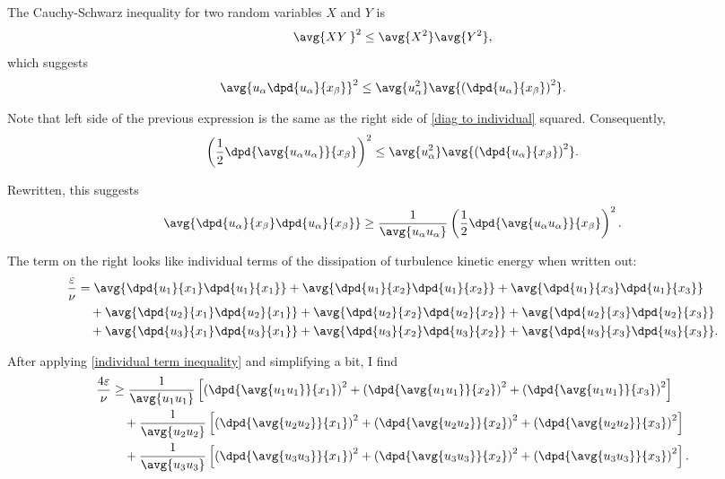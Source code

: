 \documentclass[ccbysa,note,git]{bmtreport}
\begin{document}
The Cauchy-Schwarz inequality for two random variables $X$ and $Y$ is
\begin{equation}
   \avg{X Y\kern2pt}^2 \leq \avg{X^2} \avg{Y^2},
\end{equation}
which suggests
\begin{equation}
   \avg{u_\alpha \dpd{u_\alpha}{x_\beta}}^2 \leq \avg{u_\alpha^2} \avg{\left(\dpd{u_\alpha}{x_\beta}\right)^2}.
\end{equation}

Note that left side of the previous expression is the same as the right side of \eqref{diag to individual} squared. Consequently,
\begin{equation}
   \left(\frac{1}{2} \dpd{\avg{u_\alpha u_\alpha}}{x_\beta}\right)^2 \leq \avg{u_\alpha^2} \avg{\left(\dpd{u_\alpha}{x_\beta}\right)^2}.
\end{equation}

Rewritten, this suggests
\begin{equation}
   \avg{\dpd{u_\alpha}{x_\beta} \dpd{u_\alpha}{x_\beta}} \geq \frac{1}{\avg{u_\alpha u_\alpha}} \left(\frac{1}{2} \dpd{\avg{u_\alpha u_\alpha}}{x_\beta}\right)^2. \label{eq:individual term inequality}
\end{equation}

The term on the right looks like individual terms of the dissipation of turbulence kinetic energy when written out:
\begin{align}
   \frac{\varepsilon}{\nu} &= \avg{\dpd{u_1}{x_1} \dpd{u_1}{x_1}} + \avg{\dpd{u_1}{x_2} \dpd{u_1}{x_2}} + \avg{\dpd{u_1}{x_3} \dpd{u_1}{x_3}} \notag \\
                           &\quad + \avg{\dpd{u_2}{x_1} \dpd{u_2}{x_1}} + \avg{\dpd{u_2}{x_2} \dpd{u_2}{x_2}} + \avg{\dpd{u_2}{x_3} \dpd{u_2}{x_3}} \notag \\
                           &\quad + \avg{\dpd{u_3}{x_1} \dpd{u_3}{x_1}} + \avg{\dpd{u_3}{x_2} \dpd{u_3}{x_2}} + \avg{\dpd{u_3}{x_3} \dpd{u_3}{x_3}}.
\end{align}

After applying \eqref{individual term inequality} and simplifying a bit, I find
\begin{align}
   \frac{4 \varepsilon}{\nu} &\geq \frac{1}{\avg{u_1 u_1}} \left[\left(\dpd{\avg{u_1 u_1}}{x_1}\right)^2 + \left(\dpd{\avg{u_1 u_1}}{x_2}\right)^2 + \left(\dpd{\avg{u_1 u_1}}{x_3}\right)^2\right] \notag \\
                             &\quad + \frac{1}{\avg{u_2 u_2}} \left[\left(\dpd{\avg{u_2 u_2}}{x_1}\right)^2 + \left(\dpd{\avg{u_2 u_2}}{x_2}\right)^2 + \left(\dpd{\avg{u_2 u_2}}{x_3}\right)^2\right] \notag \\
                             &\quad + \frac{1}{\avg{u_3 u_3}} \left[\left(\dpd{\avg{u_3 u_3}}{x_1}\right)^2 + \left(\dpd{\avg{u_3 u_3}}{x_2}\right)^2 + \left(\dpd{\avg{u_3 u_3}}{x_3}\right)^2\right]. \label{eq:diagonal reynolds stress inequality}
\end{align}
\end{document}
